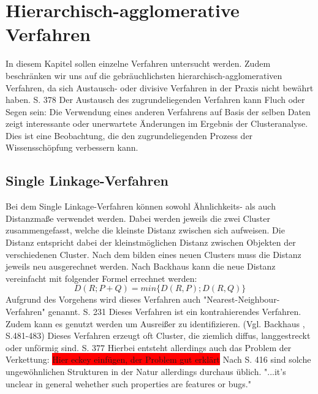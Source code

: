 \chapter{Hierarchisch-agglomerative Verfahren}

In diesem Kapitel sollen einzelne Verfahren untersucht werden. Zudem beschränken wir uns auf die gebräuchlichsten hierarchisch-agglomerativen Verfahren, da sich Austausch- oder divisive Verfahren in der Praxis nicht bewährt haben.
\cite{Piegorsch.2015} S. 378 Der Austausch des zugrundeliegenden Verfahren kann Fluch oder Segen sein: Die Verwendung eines anderen Verfahrens auf Basis der selben Daten zeigt interessante oder unerwartete Änderungen im Ergebnis der Clusteranalyse. Dies ist eine Beobachtung, die den zugrundeliegenden Prozess der Wissensschöpfung verbessern kann.

\section{Single Linkage-Verfahren}
Bei dem Single Linkage-Verfahren können sowohl Ähnlichkeits- als auch Distanzmaße verwendet werden. Dabei werden jeweils die zwei Cluster zusammengefasst, welche die kleinste Distanz zwischen sich aufweisen. Die Distanz entspricht dabei der kleinstmöglichen Distanz zwischen Objekten der verschiedenen Cluster. Nach dem bilden eines neuen Clusters muss die Distanz jeweils neu ausgerechnet werden. 
Nach Backhaus \cite{Backhaus.2016} kann die neue Distanz vereinfacht mit folgender Formel errechnet werden:
\begin{equation}
D(R;P+Q) = min\{D(R,P);D(R,Q)\}
\end{equation}
Aufgrund des Vorgehens wird dieses Verfahren auch "Nearest-Neighbour-Verfahren" genannt. \cite{Eckey.2002} S. 231
Dieses Verfahren ist ein kontrahierendes Verfahren. Zudem kann es genutzt werden um Ausreißer zu identifizieren. (Vgl. Backhaus \cite{Backhaus.2016}, S.481-483)
Dieses Verfahren erzeugt oft Cluster, die ziemlich diffus, langgestreckt oder unförmig sind. \cite{Piegorsch.2015} S. 377 
Hierbei entsteht allerdings auch das Problem der Verkettung: \colorbox{red}{Hier eckey einfügen, der Problem gut erklärt}
Nach \cite{Clarke.2009} S. 416 sind solche ungewöhnlichen Strukturen in der Natur allerdings durchaus üblich. "...it's unclear in general wehether such properties are features or bugs." 


